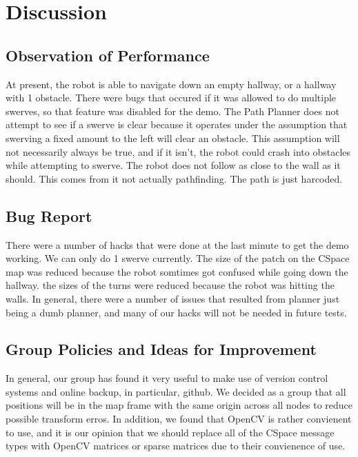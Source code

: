 \documentclass{article}
\begin{document}
\section{Discussion}
\subsection{Observation of Performance}

At present, the robot is able to navigate down an empty hallway, or a hallway with 1 obstacle.  There were bugs that occured if it was allowed to do multiple swerves, so that feature was disabled for the demo.
The Path Planner does not attempt to see if a swerve is clear because it operates under the assumption that swerving a fixed amount to the left will clear an obstacle.  
This assumption will not necessarily always be true, and if it isn't, the robot could crash into obstacles while attempting to swerve.
The robot does not follow as close to the wall as it should.  This comes from it not actually pathfinding.  The path is just harcoded.

\subsection{Bug Report}

There were a number of hacks that were done at the last minute to get the demo working.  We can only do 1 swerve currently. 
The size of the patch on the CSpace map was reduced because the robot somtimes got confused while going down the hallway.
the sizes of the turns were reduced because the robot was hitting the walls.
In general, there were a number of issues that resulted from planner just being a dumb planner, and many of our hacks will not be needed in future tests.

\subsection{Group Policies and Ideas for Improvement}

In general, our group has found it very useful to make use of version control systems and online backup, in particular, github.
We decided as a group that all positions will be in the map frame with the same origin across all nodes to reduce possible transform erros.
In addition, we found that OpenCV is rather convienent to use, and it is our opinion that we should replace all of the CSpace message types with OpenCV matrices or sparse matrices due to their convienence of use.
\end{document}
